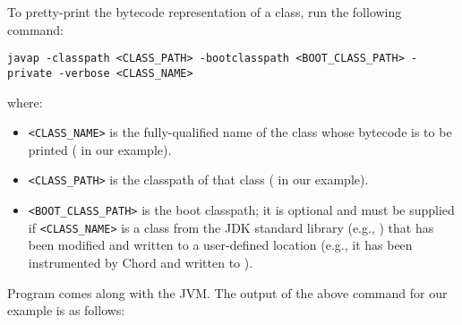 To pretty-print the bytecode representation of a class, run the following command:
\begin{framed}
\begin{verbatim}
javap -classpath <CLASS_PATH> -bootclasspath <BOOT_CLASS_PATH> -private -verbose <CLASS_NAME>
\end{verbatim}
\end{framed}

where:

\begin{itemize}
\item
\verb+<CLASS_NAME>+ is the fully-qualified name of the class whose
bytecode is to be printed ( in our example).
\item
\verb+<CLASS_PATH>+ is the classpath of that class ( in our example).
\item
\verb+<BOOT_CLASS_PATH>+ is the boot classpath; it is optional and must be supplied if
\verb+<CLASS_NAME>+ is a class from the JDK standard library (e.g., ) that has
been modified and written to a user-defined location (e.g., it has been instrumented by Chord and
written to ).
\end{itemize}

Program  comes along with the JVM.  The output of the
above command for our example is as follows:

